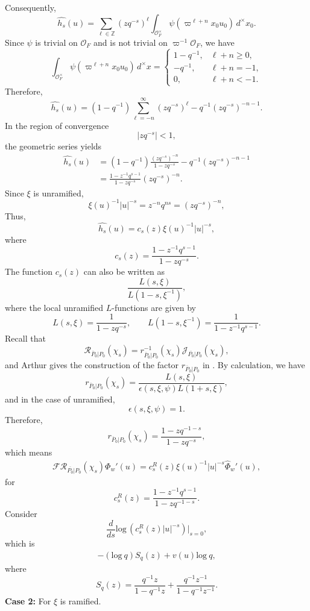 \documentclass[11pt]{amsart}
\renewcommand{\rm}{\mathrm}
\theoremstyle{definition}
\numberwithin{equation}{section}
\begin{document}
	Consequently,
	\begin{equation}
		\widehat{h_s}(u) = \sum_{\ell \in \mathbb{Z}} (z q^{-s})^\ell \int_{\mathcal{O}_F^\times} \psi(\varpi^{\ell+n} x_0 u_0) \, d^\times x_0. 
	\end{equation}
	Since \(\psi\) is trivial on \(\mathcal{O}_F\) and is not trivial on \(\varpi^{-1}\mathcal{O}_F\), we have
	\[
	\int_{\mathcal{O}_F^\times} \psi(\varpi^{\ell+n} x_0 u_0) \, d^\times x = 
	\begin{cases} 
		1 - q^{-1}, & \ell + n \geq 0, \\
		-q^{-1}, & \ell + n = -1, \\
		0, & \ell + n < -1.
	\end{cases}
	\]
	Therefore,
	\[
	\widehat{h_s}(u) = (1 - q^{-1}) \sum_{\ell=-n}^{\infty} (zq^{-s})^\ell - q^{-1}(zq^{-s})^{-n-1}.
	\]
	In the region of convergence
	\[
	|zq^{-s}| < 1,
	\]
	the geometric series yields
	\begin{align*}
		\widehat{h_s}(u) &= (1 - q^{-1}) \frac{(zq^{-s})^{-n}}{1 - zq^{-s}} - q^{-1}(zq^{-s})^{-n-1} \\
		&= \frac{1 - z^{-1}q^{s-1}}{1 - zq^{-s}} (zq^{-s})^{-n}.
	\end{align*}
	Since \(\xi\) is unramified,
	\[
	\xi(u)^{-1}|u|^{-s} = z^{-n}q^{ns} = (zq^{-s})^{-n},
	\]
	Thus,
	\[
	\widehat{h_s}(u) = c_s(z) \xi(u)^{-1}|u|^{-s},
	\]
	where \[c_s(z) = \frac{1 - z^{-1}q^{s-1}}{1 - zq^{-s}}.\]
	The function \(c_s(z)\) can also be written as
	\[
	\frac{L(s, \xi)}{L(1-s, \xi^{-1})},
	\]
	where the local unramified \(L\)-functions are given by
	\[
	L(s, \xi) = \frac{1}{1 - zq^{-s}}, \qquad L(1-s, \xi^{-1}) = \frac{1}{1 - z^{-1}q^{s-1}}.
	\]
	Recall that\[\mathscr{R}_{\overline{P}_0|P_0}(\chi_s)=r^{-1}_{\overline{P}_0|P_0}(\chi_s)\mathscr{J}_{\overline{P_0}|P_0}(\chi_s),\]and  Arthur gives the construction of the factor \(r_{\overline{P}_0|P_0}\) in \cite{Art13}. By calculation, we have 
	\[r_{\overline{P}_0|P_0}(\chi_s)=\frac{L(s, \xi)}{\epsilon(s, \xi, \psi) L(1+s, \xi)},\]and in the case of unramified, \[\epsilon(s, \xi, \psi) = 1.\]Therefore,\[r_{\overline{P}_0|P_0}(\chi_s)=\frac{1 - zq^{-1-s}}{1 - zq^{-s}},\]which means
    \begin{align}\label{fourier1}
    \mathcal{F}\mathscr{R}_{\overline{P_0}|P_0}(\chi_s)\Phi_w'(u)=c^R_s(z) \xi(u)^{-1}|u|^{-s} \hat{\Phi}_w'(u),
    \end{align}
	for \[c_s^R(z)=\frac{1 - z^{-1}q^{s-1}}{1 - zq^{-1-s}}.\]
	Consider \[\frac{d}{ds}\rm{log}\, (c_s^R(z)|u|^{-s})|_{s=0},\]which is 
    \begin{align}\label{unrami}
        -(\rm{log}\ q)S_q(z)+v(u)\rm{log}\ q,
    \end{align}
	where \[S_q(z)=\frac{q^{-1}z}{1 - q^{-1}z} + \frac{q^{-1}z^{-1}}{1 - q^{-1}z^{-1}}.\]
	\noindent\textbf{Case 2:} For \(\xi\) is ramified.
	
\end{document}
